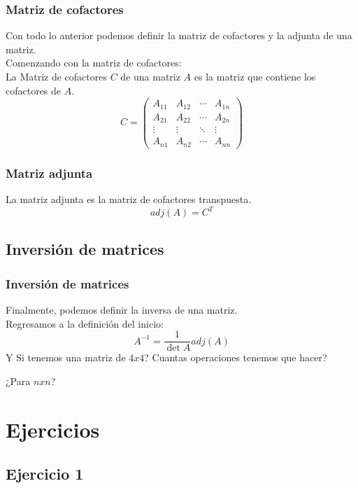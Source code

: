 \documentclass{beamer}
\begin{document}
    \begin{frame}
        \frametitle{Matriz de cofactores}
        Con todo lo anterior podemos definir la matriz de cofactores y la adjunta de una matriz.\\
        Comenzando con la matriz de cofactores:\\
        La Matriz de cofactores $C$ de una matriz $A$ es la matriz que contiene los cofactores de $A$.
        $$
        C = \begin{pmatrix}
            A_{11} & A_{12} & \cdots & A_{1n} \\
            A_{21} & A_{22} & \cdots & A_{2n} \\
            \vdots & \vdots & \ddots & \vdots \\
            A_{n1} & A_{n2} & \cdots & A_{nn}
        \end{pmatrix}
        $$
    \end{frame}

    \begin{frame}
        \frametitle{Matriz adjunta}
        La matriz adjunta es la matriz de cofactores transpuesta.
        $$
        adj(A) = C^T
        $$
    \end{frame}

    \subsection{Inversión de matrices}

    \begin{frame}
        \frametitle{Inversión de matrices}
        Finalmente, podemos definir la inversa de una matriz.\\
        Regresamos a la definición del inicio:
        $$
        A^{-1} = \frac{1}{\det{A}}adj(A)
        $$
        Y Si tenemos una matriz de $4x4$? Cuantas operaciones tenemos que hacer?\\
        \begin{center}
            ¿Para $n x n$?
        \end{center}
    \end{frame}
    \section{Ejercicios}
    \subsection{Ejercicio 1}
\end{document}
